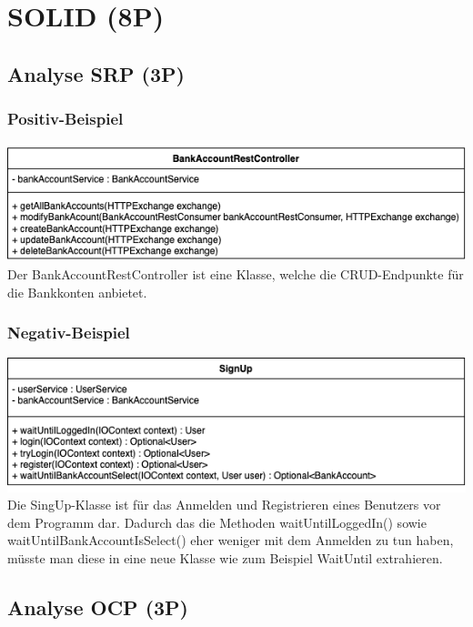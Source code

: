\section{SOLID (8P)}

\subsection{Analyse SRP (3P)}

\subsubsection*{Positiv-Beispiel}
\includegraphics[width=\linewidth]{kapitel3_solid/BankAccountRestController.png}
Der BankAccountRestController ist eine Klasse, welche die CRUD-Endpunkte für die Bankkonten anbietet.

\subsubsection*{Negativ-Beispiel}
\includegraphics[width=\linewidth]{kapitel3_solid/SignUp.png}
Die SingUp-Klasse ist für das Anmelden und Registrieren eines Benutzers vor dem Programm dar. Dadurch das die Methoden waitUntilLoggedIn() sowie waitUntilBankAccountIsSelect() eher weniger mit dem Anmelden zu tun haben, müsste man diese in eine neue Klasse wie zum Beispiel WaitUntil extrahieren.



\subsection{Analyse OCP (3P)}

